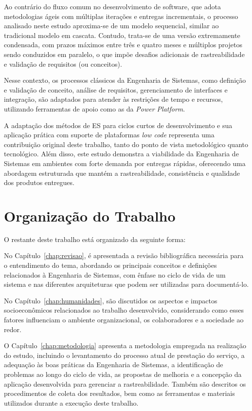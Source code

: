	Ao contrário do fluxo comum no desenvolvimento de software, que adota metodologias ágeis com múltiplas iterações e entregas incrementais,
	o processo analisado neste estudo aproxima-se de um modelo sequencial, similar ao tradicional modelo em cascata. Contudo, trata-se de uma versão extremamente
	condensada, com prazos máximos entre três e quatro meses e múltiplos projetos sendo conduzidos em paralelo, o que impõe desafios adicionais de rastreabilidade
	e validação de requisitos (ou conceitos).

	Nesse contexto, os processos clássicos da Engenharia de Sistemas, como definição e validação de conceito, análise de requisitos, gerenciamento de interfaces
	e integração, são adaptados para atender às restrições de tempo e recursos, utilizando ferramentas de apoio como as da \textit{Power Platform}.

	A adaptação dos métodos de ES para ciclos curtos de desenvolvimento e sua aplicação prática com suporte de plataformas \textit{low code} representa uma contribuição
	original deste trabalho, tanto do ponto de vista metodológico quanto tecnológico. Além disso, este estudo demonstra a viabilidade da Engenharia de Sistemas em
	ambientes com forte demanda por entregas rápidas, oferecendo uma abordagem estruturada que mantém a rastreabilidade, consistência e qualidade dos produtos entregues.

		
	\section{Organização do Trabalho}\label{sec:introducao:organizacao}

		O restante deste trabalho está organizado da seguinte forma:

		No Capítulo~\ref{chap:revisao}, é apresentada a revisão bibliográfica necessária para o entendimento do tema, abordando os principais conceitos e
		definições relacionados à Engenharia de Sistemas, com ênfase no ciclo de vida de um sistema e nas diferentes arquiteturas que podem ser utilizadas para documentá-lo.

		No Capítulo~\ref{chap:humanidades}, são discutidos os aspectos e impactos socioeconômicos relacionados ao trabalho desenvolvido, considerando como esses fatores
		influenciam o ambiente organizacional, os colaboradores e a sociedade ao redor.

		O Capítulo~\ref{chap:metodologia} apresenta a metodologia empregada na realização do estudo, incluindo o levantamento do processo atual de prestação do serviço,
		a adequação às boas práticas da Engenharia de Sistemas, a identificação de problemas ao longo do ciclo de vida, as propostas de melhoria e a concepção da aplicação
		desenvolvida para gerenciar a rastreabilidade. Também são descritos os procedimentos de coleta dos resultados, bem como as ferramentas e materiais utilizados durante a execução deste trabalho.

